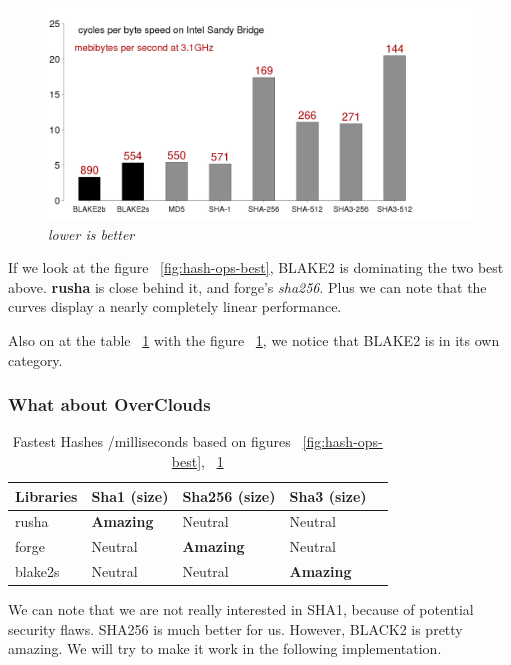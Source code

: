 \begin{figure}[htpb]
\centering
\caption{\small \sl lower is better
\label{fig:blake2-sandy}}
\includegraphics[scale=0.3]{annexes/graphs/blake2-sandy.png}
\end{figure}

If we look at the figure ~\ref{fig:hash-ops-best}, BLAKE2 is dominating the two best above. \textbf{rusha} is close behind it, and forge's \textit{sha256}. Plus we can note that the curves display a nearly completely linear performance.

Also on at the table ~\ref{tab:fastest-hashes} with the figure ~\ref{fig:blake2-sandy}, we notice that BLAKE2 is in its own category. 

\subsubsection{What about OverClouds}

\begin{table}[htpb]
\centering
\caption{Fastest Hashes /milliseconds based on figures ~\ref{fig:hash-ops-best}, ~\ref{fig:blake2-sandy}}
\label{tab:fastest-hashes}
\begin{adjustbox}{center, width=\columnwidth-20pt}
\begin{tabular}{|l|l|l|l|l|}
\hline
Libraries & Sha1 (size) & Sha256 (size) & Sha3 (size) \\ \hline
rusha    & \textbf{Amazing}    & Neutral    & Neutral        \\ \hline
forge    & Neutral    & \textbf{Amazing}    & Neutral        \\ \hline
blake2s    & Neutral    & Neutral    & \textbf{Amazing}    \\ \hline
\end{tabular}
\end{adjustbox}
\end{table}
We can note that we are not really interested in SHA1, because of potential security flaws. SHA256 is much better for us. However, BLACK2 is pretty amazing. We will try to make it work in the following implementation.

